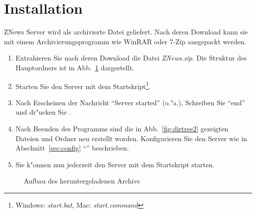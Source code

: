 

\newcommand*{\thetitle}{ZNews Server\\ Bedienungsanleitung}

\Begin



\section{Installation}

ZNews Server wird als archivierte Datei geliefert.
Nach deren Download kann sie mit einem Archivierungsprogramm
wie WinRAR oder 7-Zip ausgepackt werden.

\begin{enumerate}
    \item Extrahieren Sie nach deren Download die Datei \emph{ZNews.zip}.
    Die Struktur des Hauptordners ist in Abb.~\ref{fig:dirtree1} dargestellt.
    \item Starten Sie den Server mit dem Startskript\footnote{%
    Windows: \emph{start.bat}, Mac: \emph{start.command}}.
    \item Nach Erscheinen der Nachricht ``Server started'' (o."a.),
    Schreiben Sie ``end'' und dr"ucken Sie .
    \item Nach Beenden des Programms sind die in Abb.~\ref{fig:dirtree2}
    gezeigten Dateien und Ordner neu erstellt worden.
    Konfigurieren Sie den Server wie in Abschnitt~\ref{sec:config} ``'' beschrieben.
    \item Sie k"onnen nun jederzeit den Server mit dem Startskript starten.
\end{enumerate}

\begin{figure}[htb]
    \caption{\label{fig:dirtree1}Aufbau des heruntergeladenen Archivs}
\end{figure}

